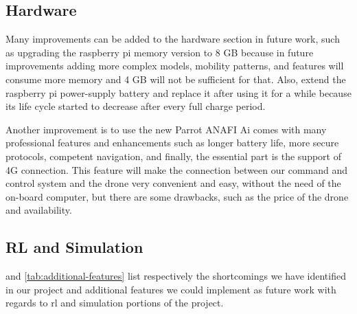 \documentclass[../main.tex]{subfiles}
\begin{document}
\subsection{Hardware}
Many improvements can be added to the hardware section in future work,
such as upgrading the raspberry pi memory version to 8 GB because in future improvements
adding more complex models, mobility patterns, and features will consume more memory 
and 4 GB will not be sufficient for that.
Also, extend the raspberry pi power-supply battery and replace it after
using it for a while because its life cycle started to decrease after every full charge period. 

Another improvement is to use the new Parrot
ANAFI Ai comes with many professional features and enhancements such as longer 
battery life, 
more secure protocols, competent navigation, and finally, the essential part is the 
support of 4G connection.
This feature will make the connection between our command and control system and the
drone very convenient and easy, without the need of the on-board computer, 
but there are some drawbacks, such as the price of the drone and availability.




 

\subsection{RL and Simulation}

 and \cref{tab:additional-features} list
respectively the shortcomings we have identified in our project and
additional features we could implement as future work with regards to
\gls{rl} and simulation portions of the project.
\end{document}
